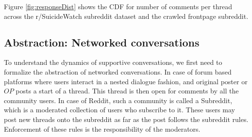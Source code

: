 Figure \ref{fig:responseDist} shows the CDF for number of comments per thread across the r/SuicideWatch subreddit dataset and the crawled frontpage subreddit. 


\subsection{Abstraction: Networked conversations}

\begin{table}
	\caption{Notations and Terms.}\label{notations}
\end{table}


\label{Sec:Conversations}
To understand the dynamics of supportive conversations, we first need to formalize the abstraction of networked conversations. In case of forum based platforms where users interact in a nested dialogue fashion, and original poster or $OP$ posts a start of a thread. This thread is then open for comments by all the community users. In case of Reddit, such a community is called a Subreddit, which is a moderated collection of users who subscribe to it. These users may post new threads onto the subreddit as far as the post follows the subreddit rules. Enforcement of these rules is the responsibility of the moderators. 

